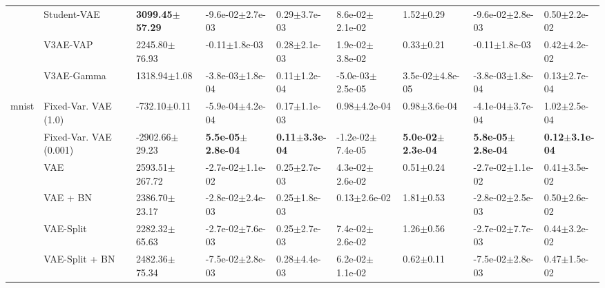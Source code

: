\begin{tabular}{lllllllll}
             & Student-VAE &  \textbf{3099.45$\pm$57.29} &           -9.6e-02$\pm$2.7e-03 &              0.29$\pm$3.7e-03 &            8.6e-02$\pm$2.1e-02 &                 1.52$\pm$0.29 &          -9.6e-02$\pm$2.8e-03 &              0.50$\pm$2.2e-02 \\
             & V3AE-VAP &           2245.80$\pm$76.93 &              -0.11$\pm$1.8e-03 &              0.28$\pm$2.1e-03 &            1.9e-02$\pm$3.8e-02 &                 0.33$\pm$0.21 &             -0.11$\pm$1.8e-03 &              0.42$\pm$4.2e-02 \\
             & V3AE-Gamma &            1318.94$\pm$1.08 &           -3.8e-03$\pm$1.8e-04 &              0.11$\pm$1.2e-04 &           -5.0e-03$\pm$2.5e-05 &           3.5e-02$\pm$4.8e-05 &          -3.8e-03$\pm$1.8e-04 &              0.13$\pm$2.7e-04 \\
mnist & Fixed-Var. VAE (1.0) &            -732.10$\pm$0.11 &           -5.9e-04$\pm$4.2e-04 &              0.17$\pm$1.1e-03 &               0.98$\pm$4.2e-04 &              0.98$\pm$3.6e-04 &          -4.1e-04$\pm$3.7e-04 &              1.02$\pm$2.5e-04 \\
             & Fixed-Var. VAE (0.001) &          -2902.66$\pm$29.23 &   \textbf{5.5e-05$\pm$2.8e-04} &     \textbf{0.11$\pm$3.3e-04} &           -1.2e-02$\pm$7.4e-05 &  \textbf{5.0e-02$\pm$2.3e-04} &  \textbf{5.8e-05$\pm$2.8e-04} &     \textbf{0.12$\pm$3.1e-04} \\
             & VAE &          2593.51$\pm$267.72 &           -2.7e-02$\pm$1.1e-02 &              0.25$\pm$2.7e-03 &            4.3e-02$\pm$2.6e-02 &                 0.51$\pm$0.24 &          -2.7e-02$\pm$1.1e-02 &              0.41$\pm$3.5e-02 \\
             & VAE + BN &           2386.70$\pm$23.17 &           -2.8e-02$\pm$2.4e-03 &              0.25$\pm$1.8e-03 &               0.13$\pm$2.6e-02 &                 1.81$\pm$0.53 &          -2.8e-02$\pm$2.5e-03 &              0.50$\pm$2.6e-02 \\
             & VAE-Split &           2282.32$\pm$65.63 &           -2.7e-02$\pm$7.6e-03 &              0.25$\pm$2.7e-03 &            7.4e-02$\pm$2.6e-02 &                 1.26$\pm$0.56 &          -2.7e-02$\pm$7.7e-03 &              0.44$\pm$3.2e-02 \\
             & VAE-Split + BN &           2482.36$\pm$75.34 &           -7.5e-02$\pm$2.8e-03 &              0.28$\pm$4.4e-03 &            6.2e-02$\pm$1.1e-02 &                 0.62$\pm$0.11 &          -7.5e-02$\pm$2.8e-03 &              0.47$\pm$1.5e-02 \\

\end{tabular}
